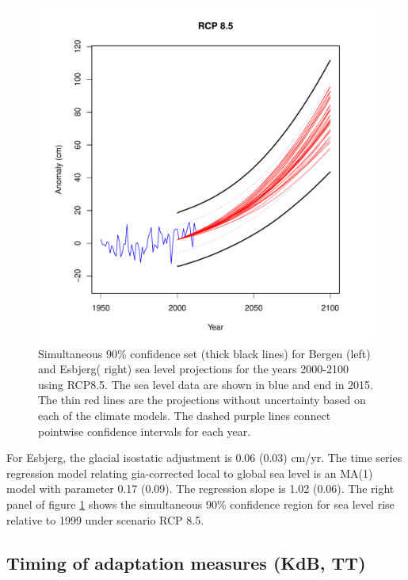 \documentclass[draft,linenumbers]{agujournal}
\begin{document}
\begin{figure}[!hbpt]
\begin{center}
\begin{minipage}{.5\textwidth}
    \includegraphics[width=\linewidth]{esbjerg_ci.pdf}

\end{minipage}
\caption{Simultaneous 90\% confidence set (thick black lines) for Bergen (left) and Esbjerg( right) sea level projections for the years 2000-2100 using RCP8.5. The sea level data are shown in blue and end in 2015. The thin red lines are the projections without uncertainty based on each of the climate models. The dashed purple lines connect pointwise confidence intervals for each year. }
\label{fig:ci}
\end{center}
\end{figure}

For Esbjerg, the glacial isostatic adjustment is 0.06 (0.03) cm/yr. The time series regression model relating gia-corrected local to global sea level is an MA(1) model with parameter 0.17 (0.09). The regression slope is 1.02 (0.06). The right panel of figure \ref{fig:ci} shows the simultaneous 90\% confidence region for sea level rise relative to 1999 under scenario RCP 8.5.


\subsection{Timing of adaptation measures {\color{blue} (KdB, TT)}}
\end{document}

